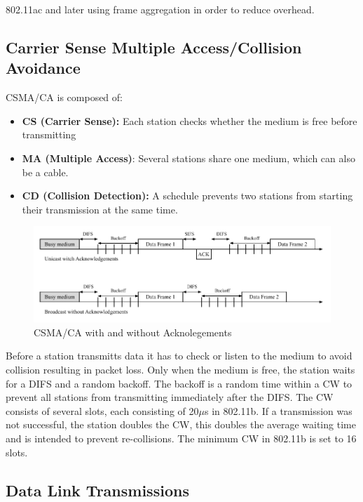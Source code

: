 802.11ac and later using frame aggregation in order to reduce overhead.

\subsection*{Carrier Sense Multiple Access/Collision Avoidance}

\ac{CSMA/CA} is composed of:
\begin{itemize}
	\setlength\itemsep{-0.0em}
	\item \textbf{CS (Carrier Sense):} Each station checks whether the medium is free before transmitting
	\item \textbf{MA (Multiple Access)}: Several stations share one medium, which can also be a cable.
	\item \textbf{CD (Collision Detection):} A schedule prevents two stations from starting their transmission at the same time.
\end{itemize}

\begin{figure}[h]
	\centering
	\includegraphics[scale=0.75]{figures/CSMA_CD.pdf}
	\caption{CSMA/CA with and without Acknolegements}
	\label{fig:CSMACD}
\end{figure}

Before a station transmitts data it has to check or listen to the medium to avoid collision resulting in packet loss.
Only when the medium is free, the station waits for a \ac{DIFS} and a random backoff.
The backoff is a random time within a \ac{CW} to prevent all stations from transmitting immediately after the \ac{DIFS}.
The \ac{CW} consists of several slots, each consisting of 20$\mu$s in 802.11b.
If a transmission was not successful, the station doubles the \ac{CW}, 
this doubles the average waiting time and is intended to prevent re-collisions.
The minimum \ac{CW} in 802.11b is set to 16 slots.

\subsection*{Data Link Transmissions}

